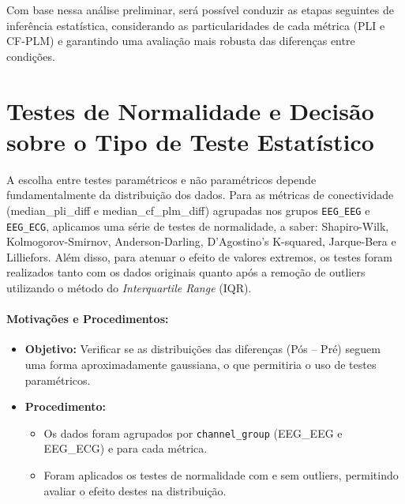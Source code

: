 Com base nessa análise preliminar, será possível conduzir as etapas seguintes de inferência estatística, considerando as particularidades de cada métrica (PLI e CF-PLM) e garantindo uma avaliação mais robusta das diferenças entre condições.

\section{Testes de Normalidade e Decisão sobre o Tipo de Teste Estatístico}
A escolha entre testes paramétricos e não paramétricos depende fundamentalmente da distribuição dos dados. Para as métricas de conectividade (median\_pli\_diff e median\_cf\_plm\_diff) agrupadas nos grupos \texttt{EEG\_EEG} e \texttt{EEG\_ECG}, aplicamos uma série de testes de normalidade, a saber: Shapiro-Wilk, Kolmogorov-Smirnov, Anderson-Darling, D'Agostino's K-squared, Jarque-Bera e Lilliefors. Além disso, para atenuar o efeito de valores extremos, os testes foram realizados tanto com os dados originais quanto após a remoção de outliers utilizando o método do \emph{Interquartile Range} (IQR).

\paragraph{Motivações e Procedimentos:}
\begin{itemize}
    \item \textbf{Objetivo:} Verificar se as distribuições das diferenças (Pós -- Pré) seguem uma forma aproximadamente gaussiana, o que permitiria o uso de testes paramétricos.
    \item \textbf{Procedimento:} 
    \begin{itemize}
        \item Os dados foram agrupados por \texttt{channel\_group} (EEG\_EEG e EEG\_ECG) e para cada métrica.
        \item Foram aplicados os testes de normalidade com e sem outliers, permitindo avaliar o efeito destes na distribuição.
    \end{itemize}
\end{itemize}

